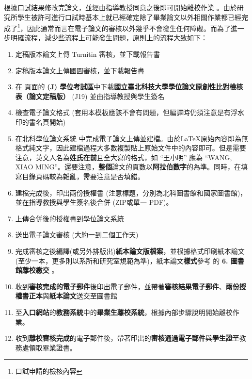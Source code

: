 \documentclass[12pt]{report}
\theoremstyle{plain}
\begin{document}
根據口試結果修改完論文，並經由指導教授同意之後即可開始離校作業 \cite{ntutlibgraduate}。由於研究所學生被許可進行口試時基本上就已經確定除了畢業論文以外相關作業都已經完成了\footnote{口試申請的檢核內容}，因此通常而言在電子論文的審核以外幾乎不會發生任何障礙。而為了進一步明確流程，減少些流程上可能發生問題，原則上的流程大致如下：
\begin{enumerate}
    \item 定稿版本論文上傳 Turnitin 審核，並下載報告書
    \item 定稿版本論文上傳國圖審核，並下載報告書
    \item 在 \cite{ntutsheet} 頁面的 \textbf{(J) 學位考試區}中下載\textbf{國立臺北科技大學學位論文原創性比對檢核表（論文定稿版）} (J19) 並由指導教授與學生簽名
    \item 檢查電子論文格式 (套用本模板應該不會有問題，但編譯時仍須注意是有浮水印的書名頁開始)
    \item 在北科學位論文系統 \cite{ntutlibupdate} 中完成電子論文上傳並建檔。由於\LaTeX 原始內容即為無格式純文字，因此建檔過程大多數複製貼上原始文件中的內容即可。但是需要注意，英文人名為\textbf{姓氏在前}且全大寫的格式，如 ``王小明'' 應為 ``WANG, XIAO MING''。還要注意，\textbf{整個}論文的頁數以\textbf{阿拉伯數字}的為準。同時，在填寫目錄頁碼較為雜亂，需要注意是否填錯。
    \item 建檔完成後，印出兩份授權書 (注意標題，分別為北科圖書館和國家圖書館)，並在指導教授與學生簽名後合併 (ZIP或單一 PDF)。
    \item 上傳合併後的授權書到學位論文系統
    \item 送出電子論文審核 (大約一到二個工作天)
    \item 完成審核之後編譯(或另外排版出)\textbf{紙本論文版檔案}，並根據格式印刷紙本論文 (至少一本，更多則以系所和研究室規範為準)，紙本論文\textbf{樣式}參考 的 \textbf{6. 圖書館離校繳交} \cite{ntutlibgraduate}。
    \item 收到\textbf{審核完成的電子郵件}後印出電子郵件，並帶著\textbf{審核結果電子郵件}、\textbf{兩份授權書正本}與\textbf{紙本論文}送交至圖書館
    \item 至\textbf{入口網站}的\textbf{教務系統}中的\textbf{畢業生離校系統}，根據內部步驟說明開始離校作業。
    \item 收到\textbf{離校審核完成}的電子郵件後，帶著印出的\textbf{審核通過電子郵件}與\textbf{學生證}至教務處領取畢業證書。
\end{enumerate}
\end{document}
